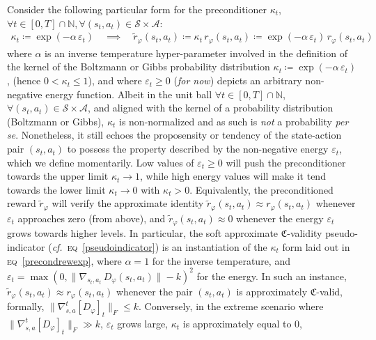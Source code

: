 Consider the following particular form for the preconditioner $\kappa_t$,
$\forall t \in [0, T] \cap \mathbb{N},
\forall (s_t, a_t) \in \mathcal{S} \times \mathcal{A}$:
\begin{align}
\kappa_t \coloneqq \exp (-\alpha \, \varepsilon_t)
\quad \implies \quad
\tilde{r}_\varphi (s_t,a_t)
\coloneqq \kappa_t \, r_\varphi (s_t,a_t)
\coloneqq \exp (-\alpha \, \varepsilon_t) \, r_\varphi (s_t,a_t)
\label{precondrewexp}
\end{align}
where $\alpha$ is an inverse temperature hyper-parameter involved in the definition of the kernel of
the Boltzmann or Gibbs probability distribution $\kappa_t \coloneqq \exp (-\alpha \, \varepsilon_t)$,
(hence $0 < \kappa_t \leq 1$), and where
$\varepsilon_t \geq 0$ (\textit{for now}) depicts an arbitrary non-negative energy function.
Albeit in the unit ball
$\forall t \in [0, T] \cap \mathbb{N}$,
$\forall (s_t, a_t) \in \mathcal{S} \times \mathcal{A}$, and aligned with the kernel of a
probability distribution (Boltzmann or Gibbs),
$\kappa_t$ is non-normalized and as such is \emph{not} a probability \textit{per se}.
Nonetheless, it still echoes the proposensity or tendency of the state-action pair $(s_t,a_t)$
to possess the property described by the non-negative energy $\varepsilon_t$, which we define momentarily.
Low values of $\varepsilon_t \geq 0$
will push the preconditioner towards the upper limit $\kappa_t \to 1$,
while high energy values will make it tend towards the lower limit $\kappa_t \to 0$ with $\kappa_t > 0$.
Equivalently, the preconditioned reward $\tilde{r}_\varphi$ will verify the approximate identity
$\tilde{r}_\varphi (s_t,a_t) \approx r_\varphi (s_t,a_t)$ whenever $\varepsilon_t$
approaches zero (from above), and $\tilde{r}_\varphi (s_t,a_t) \approx 0$ whenever
the energy $\varepsilon_t$ grows towards higher levels.
In particular,
the soft approximate $\mathfrak{C}$-validity pseudo-indicator
(\textit{cf.}~\textsc{eq}~\ref{pseudoindicator})
is an instantiation of the $\kappa_t$ form laid out in \textsc{eq}~\ref{precondrewexp},
where $\alpha=1$ for the inverse temperature, and
$\varepsilon_t = \max (0, \lVert \nabla_{s_t,a_t} \, D_\varphi (s_t,a_t) \rVert - k)^2$ for the energy.
In such an instance, $\tilde{r}_\varphi (s_t,a_t) \approx r_\varphi (s_t,a_t)$
whenever the pair $(s_t,a_t)$ is approximately $\mathfrak{C}$-valid, formally,
$\lVert \nabla_{s,a}^t[D_\varphi]_t \rVert _F \leq k$.
Conversely, in the extreme scenario where $\lVert \nabla_{s,a}^t[D_\varphi]_t \rVert _F \gg k$,
$\varepsilon_t$ grows large,
$\kappa_t$ is approximately equal to $0$,
